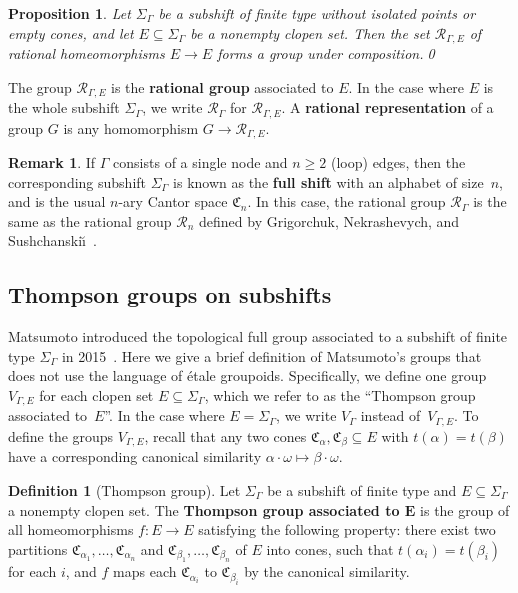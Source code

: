 \documentclass[11pt,letterpaper]{amsart}
\newtheorem{proposition}[theorem]{Proposition}
\theoremstyle{definition}
\newtheorem{definition}[theorem]{Definition}
\newtheorem{remark}[theorem]{Remark}
\newcommand{\newword}[1]{\textbf{#1}}
\newcommand{\R}{\mathcal{R}}
\newcommand{\C}{\mathfrak{C}}
\begin{document}
\begin{proposition}
Let\/ $\Sigma_\Gamma$ be a subshift of finite type without isolated points or empty cones, and let $E\subseteq \Sigma_\Gamma$ be a nonempty clopen set.  Then the set\/ $\R_{\Gamma,E}$ of rational homeomorphisms $E\to E$ forms a group under composition.\qed
\end{proposition}

The group $\R_{\Gamma,E}$ is the \newword{rational group} associated to $E$.  In the case where $E$ is the whole subshift $\Sigma_{\Gamma}$, we write $\R_{\Gamma}$ for $\R_{\Gamma,E}$.  A \newword{rational representation} of a group $G$ is any homomorphism $G\to \R_{\Gamma,E}$.

\begin{remark}\label{rem:FullShift}
If $\Gamma$ consists of a single node and $n\geq 2$ (loop) edges, then the corresponding subshift $\Sigma_\Gamma$ is known as the \newword{full shift} with an alphabet of size~$n$, and is the usual $n$-ary Cantor space $\C_n$. In this case, the rational group $\R_\Gamma$ is the same as the rational group $\R_n$ defined by Grigorchuk, Nekrashevych, and Sushchanski\u\i~\cite{GNS}.  \end{remark}


\subsection{Thompson groups on subshifts}\label{ssec:thompson}

Matsumoto introduced the topological full group associated to a subshift of finite type $\Sigma_\Gamma$ in 2015~\cite{Matsumoto15}. Here we give a brief definition of Matsumoto's groups that does not use the language of \'{e}tale groupoids. Specifically, we define one group $V_{\Gamma,E}$ for each clopen set $E\subseteq \Sigma_\Gamma$, which we refer to as the ``Thompson group associated to~$E$''.  In the case where $E=\Sigma_\Gamma$, we write $V_\Gamma$ instead of~$V_{\Gamma,E}$. To define the groups $V_{\Gamma,E}$, recall that any two cones $\C_\alpha,\C_\beta\subseteq E$ with $t(\alpha)=t(\beta)$ have a corresponding canonical similarity $\alpha\cdot\omega \mapsto \beta\cdot\omega$.

\begin{definition}[Thompson group]\label{def:thomp}
Let $\Sigma_\Gamma$ be a subshift of finite type and $E\subseteq \Sigma_\Gamma$ a nonempty clopen set. The \newword{Thompson group associated to $\boldsymbol{E}$} is the group of all homeomorphisms $f\colon E\to E$ satisfying the following property: there exist two partitions $\C_{\alpha_1},\ldots,\C_{\alpha_n}$ and $\C_{\beta_1},\ldots,\C_{\beta_n}$ of $E$ into cones, such that $t(\alpha_i)=t(\beta_i)$ for each $i$, and $f$ maps each $\C_{\alpha_i}$ to $\C_{\beta_i}$ by the canonical similarity.
\end{definition}
\end{document}
